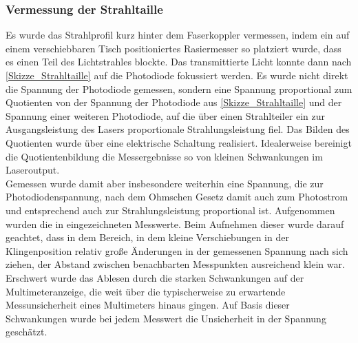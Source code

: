 \documentclass[11pt,a4paper,oneside]{scrartcl}
\begin{document}
\subsubsection{Vermessung der Strahltaille}\label{Durchführung Vermessung der Strahltaille}
\setcounter{imEnv}{4}
Es wurde das Strahlprofil kurz hinter dem Faserkoppler vermessen, indem ein auf einem verschiebbaren Tisch positioniertes Rasiermesser so platziert wurde, dass es einen Teil des Lichtstrahles blockte. Das transmittierte Licht konnte dann nach \ref{Skizze_Strahltaille} auf die Photodiode fokussiert werden. Es wurde nicht direkt die Spannung der Photodiode gemessen, sondern eine Spannung proportional zum Quotienten von der Spannung der Photodiode aus \ref{Skizze_Strahltaille} und der Spannung einer weiteren Photodiode, auf die über einen Strahlteiler ein zur Ausgangsleistung des Lasers proportionale Strahlungsleistung fiel. Das Bilden des Quotienten wurde über eine elektrische Schaltung realisiert. Idealerweise bereinigt die Quotientenbildung die Messergebnisse so von kleinen Schwankungen im Laseroutput.\\
Gemessen wurde damit aber insbesondere weiterhin eine Spannung, die zur Photodiodenspannung, nach dem Ohmschen Gesetz damit auch zum Photostrom und entsprechend auch zur Strahlungsleistung proportional ist. Aufgenommen wurden die in  eingezeichneten Messwerte. Beim Aufnehmen dieser wurde darauf geachtet, dass in dem Bereich, in dem kleine Verschiebungen in der Klingenposition relativ große Änderungen in der gemessenen Spannung nach sich ziehen, der Abstand zwischen benachbarten Messpunkten ausreichend klein war. Erschwert wurde das Ablesen durch die starken Schwankungen auf der Multimeteranzeige, die weit über die typischerweise zu erwartende Messunsicherheit eines Multimeters hinaus gingen. Auf Basis dieser Schwankungen wurde bei jedem Messwert die Unsicherheit in der Spannung geschätzt.
\end{document}
